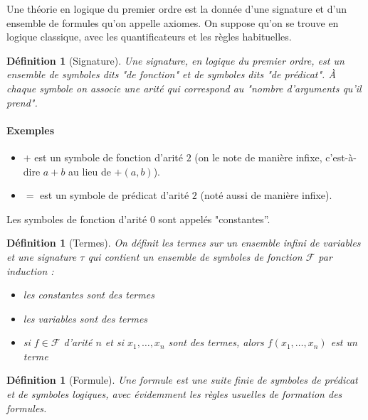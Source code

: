\documentclass[a4paper,12pt]{article}
\theoremstyle{plain}
\newtheorem{defi}[theo]{Définition}
\begin{document}
Une théorie en logique du premier ordre est la donnée d'une signature et d'un ensemble de formules qu'on appelle axiomes. On suppose qu'on se trouve en logique classique, avec les quantificateurs et les règles habituelles.

\begin{defi}[Signature]
Une signature, en logique du premier ordre, est un ensemble de symboles dits "de fonction" et de symboles dits "de prédicat". À chaque symbole on associe une arité qui correspond au "nombre d'arguments qu'il prend".
\end{defi}

\paragraph{Exemples} 
\begin{itemize}
\setlength\itemsep{ -1.5 em}
\item $+$ est un symbole de fonction d'arité $2$ (on le note de manière infixe, c'est-à-dire $a + b$ au lieu de $+(a,b)$).\\
\item $=$ est un symbole de prédicat d'arité $2$ (noté aussi de manière infixe).
\end{itemize}

Les symboles de fonction d'arité $0$ sont appelés "constantes''.

\clearpage

\begin{defi}[Termes]
On définit les termes sur un ensemble infini de variables et une signature $\tau$ qui contient un ensemble de symboles de fonction $\mathcal{F}$ par induction :
\begin{itemize}
\setlength\itemsep{ -1.5 em}
\item les constantes sont des termes\\
\item les variables sont des termes\\
\item si $f \in \mathcal{F}$ d'arité $n$ et si $x_1, \dots, x_n$ sont des termes, alors $f(x_1, \dots, x_n)$ est un terme
\end{itemize}
\end{defi}

\begin{defi}[Formule]
Une formule est une suite finie de symboles de prédicat et de symboles logiques, avec évidemment les règles usuelles de formation des formules.
\end{defi}
\end{document}
